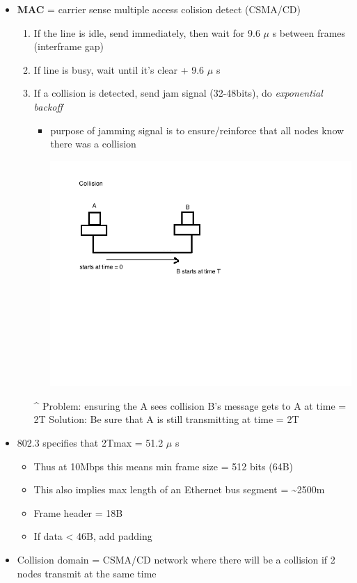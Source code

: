 \documentclass[11pt]{article}
\begin{document}
\begin{itemize}
\item \textbf{MAC} = carrier sense multiple access colision detect (CSMA/CD)
\begin{enumerate}
\item If the line is idle, send immediately, then wait for 9.6 \(\mu\) s between
frames (interframe gap)
\item If line is busy, wait until it's clear + 9.6 \(\mu\) s
\item If a collision is detected, send jam signal (32-48bits), do \emph{exponential
backoff}
\begin{itemize}
\item purpose of jamming signal is to ensure/reinforce that all nodes know
there was a collision

\includegraphics[width=.9\linewidth]{diagrams/fig7.png}
\end{itemize}
\^{} Problem: ensuring the A sees collision
B's message gets to A at time = 2T
Solution: Be sure that A is still transmitting at time = 2T
\end{enumerate}

\item 802.3 specifies that 2Tmax = 51.2 \(\mu\) s
\begin{itemize}
\item Thus at 10Mbps this means min frame size = 512 bits (64B)
\item This also implies max length of an Ethernet bus segment = \textasciitilde{}2500m
\item Frame header = 18B
\item If data < 46B, add padding
\end{itemize}

\item Collision domain = CSMA/CD network where there will be a collision if 2
nodes transmit at the same time
\end{itemize}
\end{document}
